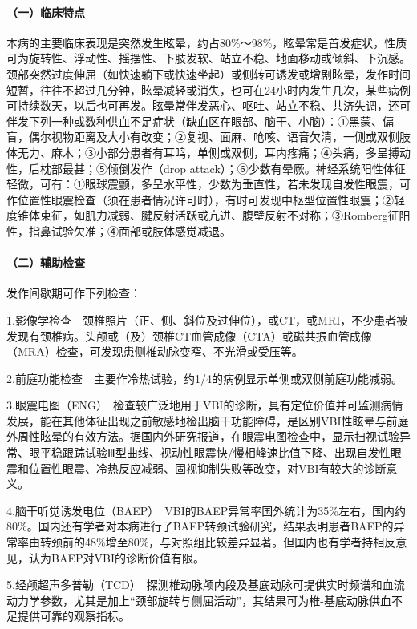 \paragraph{（一）临床特点}

本病的主要临床表现是突然发生眩晕，约占80\%～98\%，眩晕常是首发症状，性质可为旋转性、浮动性、摇摆性、下肢发软、站立不稳、地面移动或倾斜、下沉感。颈部突然过度伸屈（如快速躺下或快速坐起）或侧转可诱发或增剧眩晕，发作时间短暂，往往不超过几分钟，眩晕减轻或消失，也可在24小时内发生几次，某些病例可持续数天，以后也可再发。眩晕常伴发恶心、呕吐、站立不稳、共济失调，还可伴发下列一种或数种供血不足症状（缺血区在眼部、脑干、小脑）：①黑蒙、偏盲，偶尔视物距离及大小有改变；②复视、面麻、呛咳、语音欠清，一侧或双侧肢体无力、麻木；③小部分患者有耳鸣，单侧或双侧，耳内疼痛；④头痛，多呈搏动性，后枕部最甚；⑤倾倒发作（drop
attack）；⑥少数有晕厥。神经系统阳性体征轻微，可有：①眼球震颤，多呈水平性，少数为垂直性，若未发现自发性眼震，可作位置性眼震检查（须在患者情况许可时），有时可发现中枢型位置性眼震；②轻度锥体束征，如肌力减弱、腱反射活跃或亢进、腹壁反射不对称；③Romberg征阳性，指鼻试验欠准；④面部或肢体感觉减退。

\paragraph{（二）辅助检查}

发作间歇期可作下列检查：

1.影像学检查　颈椎照片（正、侧、斜位及过伸位），或CT，或MRI，不少患者被发现有颈椎病。头颅或（及）颈椎CT血管成像（CTA）或磁共振血管成像（MRA）检查，可发现患侧椎动脉变窄、不光滑或受压等。

2.前庭功能检查　主要作冷热试验，约1/4的病例显示单侧或双侧前庭功能减弱。

3.眼震电图（ENG）　检查较广泛地用于VBI的诊断，具有定位价值并可监测病情发展，能在其他体征出现之前敏感地检出脑干功能障碍，是区别VBI性眩晕与前庭外周性眩晕的有效方法。据国内外研究报道，在眼震电图检查中，显示扫视试验异常、眼平稳跟踪试验Ⅲ型曲线、视动性眼震快/慢相峰速比值下降、出现自发性眼震和位置性眼震、冷热反应减弱、固视抑制失败等改变，对VBI有较大的诊断意义。

4.脑干听觉诱发电位（BAEP）　VBI的BAEP异常率国外统计为35\%左右，国内约80\%。国内还有学者对本病进行了BAEP转颈试验研究，结果表明患者BAEP的异常率由转颈前的48\%增至80\%，与对照组比较差异显著。但国内也有学者持相反意见，认为BAEP对VBI的诊断价值有限。

5.经颅超声多普勒（TCD）　探测椎动脉颅内段及基底动脉可提供实时频谱和血流动力学参数，尤其是加上“颈部旋转与侧屈活动”，其结果可为椎-基底动脉供血不足提供可靠的观察指标。

